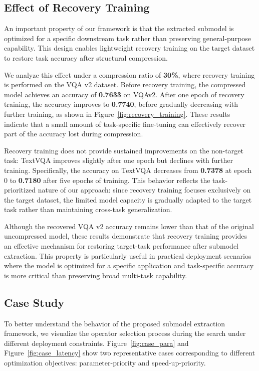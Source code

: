 \documentclass[11pt]{article}
\begin{document}
\subsection{Effect of Recovery Training}

An important property of our framework is that the extracted submodel is optimized for a specific downstream task rather than preserving general-purpose capability. This design enables lightweight recovery training on the target dataset to restore task accuracy after structural compression.

We analyze this effect under a compression ratio of \textbf{30\%}, where recovery training is performed on the VQA v2 dataset. Before recovery training, the compressed model achieves an accuracy of \textbf{0.7633} on VQAv2. After one epoch of recovery training, the accuracy improves to \textbf{0.7740}, before gradually decreasing with further training, as shown in Figure~\ref{fig:recovery_training}. These results indicate that a small amount of task-specific fine-tuning can effectively recover part of the accuracy lost during compression.

Recovery training does not provide sustained improvements on the non-target task: TextVQA improves slightly after one epoch but declines with further training. Specifically, the accuracy on TextVQA decreases from \textbf{0.7378} at epoch 0 to \textbf{0.7180} after five epochs of training. This behavior reflects the task-prioritized nature of our approach: since recovery training focuses exclusively on the target dataset, the limited model capacity is gradually adapted to the target task rather than maintaining cross-task generalization.

Although the recovered VQA v2 accuracy remains lower than that of the original uncompressed model, these results demonstrate that recovery training provides an effective mechanism for restoring target-task performance after submodel extraction. This property is particularly useful in practical deployment scenarios where the model is optimized for a specific application and task-specific accuracy is more critical than preserving broad multi-task capability.


\subsection{Case Study}

To better understand the behavior of the proposed submodel extraction framework, we visualize the operator selection process during the search under different deployment constraints. Figure~\ref{fig:case_para} and Figure~\ref{fig:case_latency} show two representative cases corresponding to different optimization objectives: parameter-priority and speed-up-priority.
\end{document}
